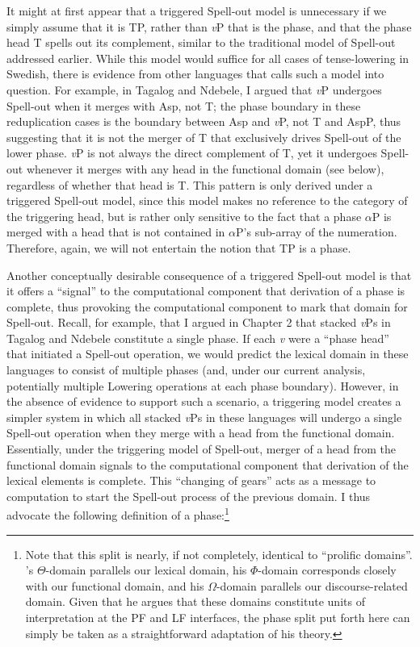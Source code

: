 It might at first appear that a triggered Spell-out model is unnecessary if we simply assume that it is TP, rather than {\it v}P that is the phase, and that the phase head T spells out its complement, similar to the traditional model of Spell-out addressed earlier. While this model would suffice for all cases of tense-lowering in Swedish, there is evidence from other languages that calls such a model into question.  For example, in Tagalog and Ndebele, I argued that {\it v}P undergoes Spell-out when it merges with Asp, not T; the phase boundary in these reduplication cases is the boundary between Asp and {\it v}P, not T and AspP, thus suggesting that it is not the merger of T that exclusively drives Spell-out of the lower phase. {\it v}P is not always the direct complement of T, yet it undergoes Spell-out whenever it merges with any head in the functional domain (see below), regardless of whether that head is T. This pattern is only derived under a triggered Spell-out model, since this model makes no reference to the category of the triggering head, but is rather only sensitive to the fact that a phase $\alpha$P is merged with a head that is not contained in $\alpha$P's sub-array of the numeration. Therefore, again, we will not entertain the notion that TP is a phase.

Another conceptually desirable consequence of a triggered Spell-out model is that it offers a ``signal'' to the computational component that derivation of a phase is complete, thus provoking the computational component to mark that domain for Spell-out. Recall, for example, that I argued in Chapter 2 that stacked {\it v}Ps in Tagalog and Ndebele constitute a single phase. If each {\it v} were a ``phase head'' that initiated a Spell-out operation, we would predict the lexical domain in these languages to consist of multiple phases (and, under our current analysis, potentially multiple Lowering operations at each phase boundary). However, in the absence of evidence to support such a scenario, a triggering model creates a simpler system in which all stacked {\it v}Ps in these languages will undergo a single Spell-out operation when they merge with a head from the functional domain. Essentially, under the triggering model of Spell-out, merger of a head from the functional domain signals to the computational component that derivation of the lexical elements is complete. This ``changing of gears'' acts as a message to computation to start the Spell-out process of the previous domain. I thus advocate the following definition of a phase:\footnote{Note that this split is nearly, if not completely, identical to  ``prolific domains''. \citeauthor{grohmann2003}'s $\Theta$-domain parallels our lexical domain, his $\Phi$-domain corresponds closely with our functional domain, and his $\Omega$-domain parallels our discourse-related domain. Given that he argues that these domains constitute units of interpretation at the PF and LF interfaces, the phase split put forth here can simply be taken as a straightforward adaptation of his theory.}

